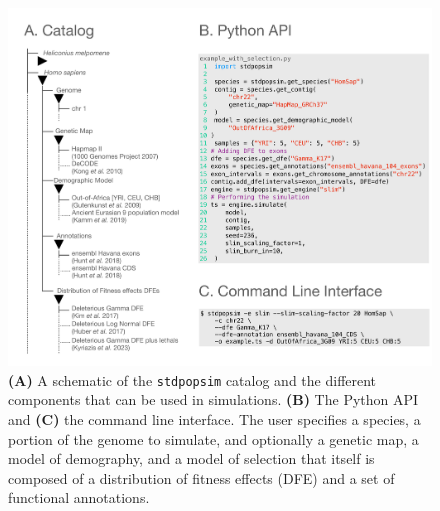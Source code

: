 \documentclass[hidelinks]{article}
\newcommand{\stdpopsim}{\texttt{stdpopsim}\xspace}
\begin{document}
    \begin{figure}[t!]
        \includegraphics[width=\linewidth]{figures/schematics/catalog.pdf}
        \caption{\label{fig:schematic}
        \textbf{(A)} A schematic of the \stdpopsim catalog and the different components that
        can be used in simulations.
        \textbf{(B)} The Python API and \textbf{(C)} the command line interface.
        The user specifies a species, a portion of
        the genome to simulate, and optionally a genetic map, a model of
        demography, and a model of selection that itself is composed of a
        distribution of fitness effects (DFE) and a set of functional
        annotations. }
    \end{figure}
\end{document}
